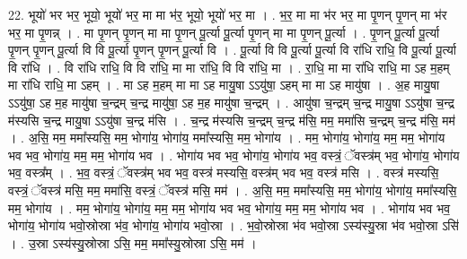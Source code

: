 \documentclass[17pt]{extarticle}
\begin{document}
22. भूयो॑ भर भर॒ भूयो॒ भूयो॑ भर॒ मा मा भ॑र॒ भूयो॒ भूयो॑ भर॒ मा । . भ॒र॒ मा मा भ॑र भर॒ मा पृ॒णन् पृ॒णन् मा भ॑र भर॒ मा पृ॒णन्न् । . मा पृ॒णन् पृ॒णन् मा मा पृ॒णन् पू॒र्त्या पू॒र्त्या पृ॒णन् मा मा पृ॒णन् पू॒र्त्या । . पृ॒णन् पू॒र्त्या पू॒र्त्या पृ॒णन् पृ॒णन् पू॒र्त्या वि वि पू॒र्त्या पृ॒णन् पृ॒णन् पू॒र्त्या वि । . पू॒र्त्या वि वि पू॒र्त्या पू॒र्त्या वि रा॑धि राधि॒ वि पू॒र्त्या पू॒र्त्या वि रा॑धि । . वि रा॑धि राधि॒ वि वि रा॑धि॒ मा मा रा॑धि॒ वि वि रा॑धि॒ मा । . रा॒धि॒ मा मा रा॑धि राधि॒ मा ऽह म॒हम् मा रा॑धि राधि॒ मा ऽहम् । . मा ऽह म॒हम् मा मा ऽह मायु॒षा ऽऽयु॑षा॒ ऽहम् मा मा ऽह मायु॑षा । . अ॒ह मायु॒षा ऽऽयु॑षा॒ ऽह म॒ह मायु॑षा च॒न्द्रम् च॒न्द्र मायु॑षा॒ ऽह म॒ह मायु॑षा च॒न्द्रम् । . आयु॑षा च॒न्द्रम् च॒न्द्र मायु॒षा ऽऽयु॑षा च॒न्द्र म॑स्यसि च॒न्द्र मायु॒षा ऽऽयु॑षा च॒न्द्र म॑सि । . च॒न्द्र म॑स्यसि च॒न्द्रम् च॒न्द्र म॑सि॒ मम॒ ममा॑सि च॒न्द्रम् च॒न्द्र म॑सि॒ मम॑ । . अ॒सि॒ मम॒ ममा᳚स्यसि॒ मम॒ भोगा॑य॒ भोगा॑य॒ ममा᳚स्यसि॒ मम॒ भोगा॑य । . मम॒ भोगा॑य॒ भोगा॑य॒ मम॒ मम॒ भोगा॑य भव भव॒ भोगा॑य॒ मम॒ मम॒ भोगा॑य भव । . भोगा॑य भव भव॒ भोगा॑य॒ भोगा॑य भव॒ वस्त्रं॒ ॅवस्त्र॑म् भव॒ भोगा॑य॒ भोगा॑य भव॒ वस्त्र᳚म् । . भ॒व॒ वस्त्रं॒ ॅवस्त्र॑म् भव भव॒ वस्त्र॑ मस्यसि॒ वस्त्र॑म् भव भव॒ वस्त्र॑ मसि । . वस्त्र॑ मस्यसि॒ वस्त्रं॒ ॅवस्त्र॑ मसि॒ मम॒ ममा॑सि॒ वस्त्रं॒ ॅवस्त्र॑ मसि॒ मम॑ । . अ॒सि॒ मम॒ ममा᳚स्यसि॒ मम॒ भोगा॑य॒ भोगा॑य॒ ममा᳚स्यसि॒ मम॒ भोगा॑य । . मम॒ भोगा॑य॒ भोगा॑य॒ मम॒ मम॒ भोगा॑य भव भव॒ भोगा॑य॒ मम॒ मम॒ भोगा॑य भव । . भोगा॑य भव भव॒ भोगा॑य॒ भोगा॑य भवो॒स्रोस्रा भ॑व॒ भोगा॑य॒ भोगा॑य भवो॒स्रा । . भ॒वो॒स्रोस्रा भ॑व भवो॒स्रा ऽस्य॑स्यु॒स्रा भ॑व भवो॒स्रा ऽसि॑ । . उ॒स्रा ऽस्य॑स्यु॒स्रोस्रा ऽसि॒ मम॒ ममा᳚स्यु॒स्रोस्रा ऽसि॒ मम॑ । \newline
\end{document}
